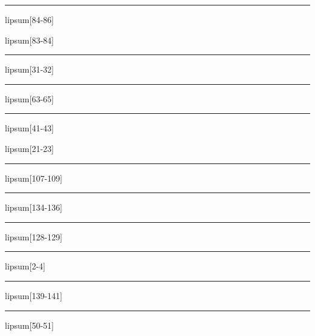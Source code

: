 \documentclass[11pt,a4paper]{article}
\begin{document}
\begin{simplewrap}
  \textcolor{magenta!14}{\rule{5.4cm}{5.4cm}}
\end{simplewrap}
lipsum[84-86]

lipsum[83-84]

\begin{simplewrap}
  \textcolor{yellow!58}{\rule{3.1cm}{3.4cm}}
\end{simplewrap}
lipsum[31-32]

\begin{simplewrap}
  \textcolor{olive!20}{\rule{5.1cm}{6.4cm}}
\end{simplewrap}
lipsum[63-65]

\begin{simplewrap}
  \textcolor{blue!18}{\rule{3.3cm}{8.8cm}}
\end{simplewrap}
lipsum[41-43]

lipsum[21-23]

\begin{simplewrap}
  \textcolor{red!10}{\rule{3.5cm}{2.7cm}}
\end{simplewrap}
lipsum[107-109]

\begin{simplewrap}
  \textcolor{red!54}{\rule{3.4cm}{3.1cm}}
\end{simplewrap}
lipsum[134-136]

\begin{simplewrap}
  \textcolor{magenta!21}{\rule{4.8cm}{2.3cm}}
\end{simplewrap}
lipsum[128-129]

\begin{simplewrap}
  \textcolor{green!50}{\rule{5.5cm}{4.4cm}}
\end{simplewrap}
lipsum[2-4]

\begin{simplewrap}
  \textcolor{yellow!17}{\rule{6.0cm}{9.8cm}}
\end{simplewrap}
lipsum[139-141]

\begin{simplewrap}
  \textcolor{blue!59}{\rule{4.9cm}{3.7cm}}
\end{simplewrap}
lipsum[50-51]
\end{document}
